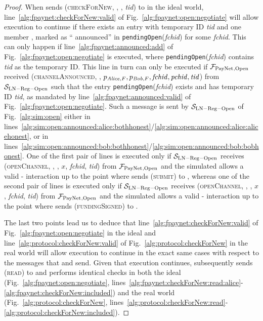 \begin{proof}
  When \environment{} sends (\textsc{checkForNew}, \alice, \bob, \textit{tid})
  to \alice{} in the ideal world, line~\ref{alg:fpaynet:checkForNew:valid} of
  Fig.~\ref{alg:fpaynet:open:negotiate} will allow execution to continue if
  there exists an entry with temporary ID \textit{tid} and one member \alice,
  marked as ``\alice{} announced'' in \texttt{pendingOpen}(\textit{fchid}) for
  some \textit{fchid}. This can only happen if
  line~\ref{alg:fpaynet:announced:add} of Fig.~\ref{alg:fpaynet:open:negotiate}
  is executed, where \texttt{pendingOpen}(\textit{fchid}) contains \textit{tid}
  as the temporary ID. This line in turn can only be executed if
  $\mathcal{F}_{\mathrm{PayNet}}{}_{\mathrm{, Open}}$ received (\textsc{channelAnnounced}, \alice,
  $p_{\mathit{Alice}, F}, p_{\mathit{Bob}, F}, \mathit{fchid}, \mathit{pchid}, \mathit{tid}$)
  from $\mathcal{S}_{\mathrm{LN - Reg - Open}}$ such that the entry
  \texttt{pendingOpen}(\textit{fchid}) exists and has temporary ID \textit{tid},
  as mandated by line~\ref{alg:fpaynet:announced:valid} of
  Fig.~\ref{alg:fpaynet:open:negotiate}. Such a message is sent by
  $\mathcal{S}_{\mathrm{LN - Reg - Open}}$ of Fig.~\ref{alg:sim:open} either in
  lines~\ref{alg:sim:open:announced:alice:bothhonest}/\ref{alg:sim:open:announced:alice:alicehonest},
  or in
  lines~\ref{alg:sim:open:announced:bob:bothhonest}/\ref{alg:sim:open:announced:bob:bobhonest}.
  One of the first pair of lines is executed only if $\mathcal{S}_{\mathrm{LN -
  Reg - Open}}$ receives (\textsc{openChannel}, \alice, \bob, $x$,
  \textit{fchid}, \textit{tid}) from $\mathcal{F}_{\mathrm{PayNet}}{}_{\mathrm{, Open}}$ and the
  simulated \adversary{} allows a valid \alice-\bob{} interaction up to the
  point where \alice{} sends (\textsc{submit}) to \ledger, whereas one of the
  second pair of lines is executed only if $\mathcal{S}_{\mathrm{LN - Reg -
  Open}}$ receives (\textsc{openChannel}, \bob, \alice, $x$, \textit{fchid},
  \textit{tid}) from $\mathcal{F}_{\mathrm{PayNet}}{}_{\mathrm{, Open}}$ and the simulated
  \adversary{} allows a valid \alice-\bob{} interaction up to the point where
  \alice{} sends (\textsc{fundingSigned}) to \bob.

  The last two points lead us to deduce that
  line~\ref{alg:fpaynet:checkForNew:valid} of
  Fig.~\ref{alg:fpaynet:open:negotiate} in the ideal and
  line~\ref{alg:protocol:checkForNew:valid} of
  Fig.~\ref{alg:protocol:checkForNew} in the real world will allow execution to
  continue in the exact same cases with respect to the messages that
  \environment{} and \adversary{} send. Given that execution continues, \alice{}
  subsequently sends (\textsc{read}) to \ledger{} and performs identical checks
  in both the ideal (Fig.~\ref{alg:fpaynet:open:negotiate},
  lines~\ref{alg:fpaynet:checkForNew:read:alice}-\ref{alg:fpaynet:checkForNew:included})
  and the real world (Fig.~\ref{alg:protocol:checkForNew},
  lines~\ref{alg:protocol:checkForNew:read}-\ref{alg:protocol:checkForNew:included}).


\end{proof}
